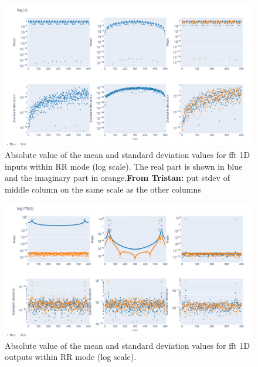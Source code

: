 \documentclass[11pt]{article}
\newcommand{\tristan}[1]{\color{orange}\textbf{From Tristan:} #1\color{black}\xspace}
\begin{document}
\begin{figure}
    \centering
    \includegraphics[width=\linewidth]{figure/FFT/fft_x.pdf}
    \caption{Absolute value of the mean and standard deviation values for 
    fft 1D inputs within RR mode (log scale). The real part is shown in blue and the imaginary part in orange.\tristan{put stdev of middle column on the same scale as the other columns}}
    \label{fig:fft1D_mean}
\end{figure}

\begin{figure}
    \centering
    \includegraphics[width=\linewidth]{figure/FFT/fft_y.pdf}
    \caption{Absolute value of the mean and standard deviation values 
    for fft 1D outputs within RR mode (log scale).}
    \label{fig:fft1D_std}
\end{figure}
\end{document}
